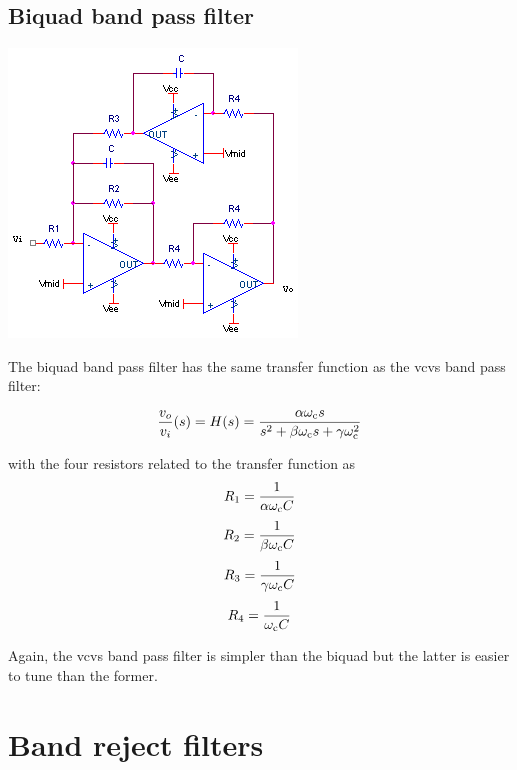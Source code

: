 \subsection{Biquad band pass filter}
\begin{center}
	\includegraphics{schematics/biquad_bandpass.PNG}
\end{center}
The biquad band pass filter has the same transfer function as the \ac{vcvs} band pass filter:

\textcolor{red}{
\begin{equation}
\frac{\vout}{\vin}(s) = \Hs = \frac{\alpha \wcutoff s}{s^2 + \beta\wcutoff s + \gamma \wcutoff^2}
\label{eq:biquad_bandpass}
\end{equation}
}

with the four resistors related to the transfer function as
\begin{equation}
R_1 = \frac{1}{\alpha \omega_\mathrm{c} C}
\end{equation}
\begin{equation}
R_2 = \frac{1}{\beta \omega_\mathrm{c} C}
\end{equation}
\begin{equation}
R_3 = \frac{1}{\gamma \omega_\mathrm{c} C}
\end{equation}
\begin{equation}
R_4 = \frac{1}{\omega_\mathrm{c} C}
\end{equation}

Again, the \ac{vcvs} band pass filter is simpler than the biquad but the latter is easier to tune than the former. \autocite[140]{op-amp-circuits-johnson}

\section{Band reject filters}

